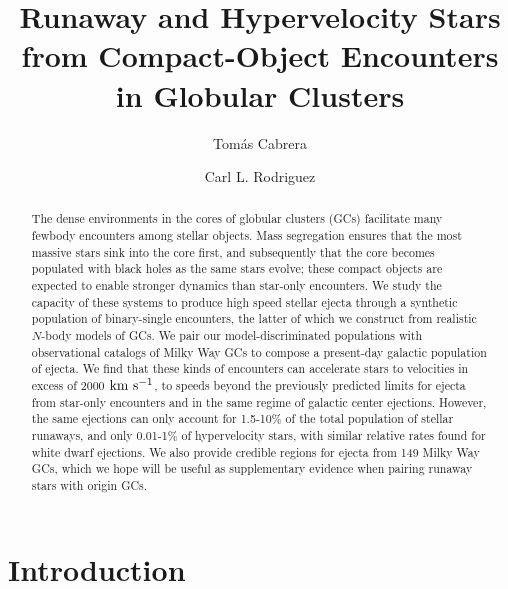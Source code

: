 \documentclass[twocolumn]{aastex631}
\newcommand{\kms}{${\rm km~s^{-1}}$}
\begin{document}
\title{Runaway and Hypervelocity Stars from  Compact-Object Encounters in Globular Clusters}

\author[0000-0002-1270-7666]{Tom\'as Cabrera}

\author[0000-0003-4175-8881]{Carl L. Rodriguez}

\begin{abstract}
    The dense environments in the cores of globular clusters (GCs) facilitate many fewbody encounters among stellar objects.
 	Mass segregation ensures that the most massive stars sink into the core first, and subsequently that the core becomes populated with black holes as the same stars evolve; these compact objects are expected to enable stronger dynamics than star-only encounters.
 	We study the capacity of these systems to produce high speed stellar ejecta through a synthetic population of binary-single encounters, the latter of which we construct from realistic $N$-body models of GCs.
 	We pair our model-discriminated populations with observational catalogs of Milky Way GCs to compose a present-day galactic population of ejecta.
 	We find that these kinds of encounters can accelerate stars to velocities in excess of 2000 \kms, to speeds beyond the previously predicted limits for ejecta from star-only encounters and in the same regime of galactic center ejections.
	However, the same ejections can only account for 1.5-10\% of the total population of stellar runaways, and only 0.01-1\% of hypervelocity stars, with similar relative rates found for white dwarf ejections.
	We also provide credible regions for ejecta from 149 Milky Way GCs, which we hope will be useful as supplementary evidence when pairing runaway stars with origin GCs.
\end{abstract}

\section{Introduction}
\label{sec:intro}
\end{document}
